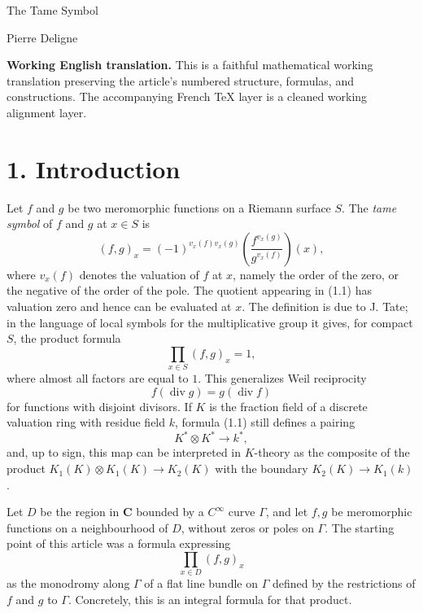 \documentclass[11pt]{article}
\theoremstyle{remark}
\newcommand{\C}{\mathbf C}
\begin{document}
\begin{center}
 {\Large The Tame Symbol}\par
 \vspace{0.5em}
 {Pierre Deligne}\par
\end{center}

\noindent\textbf{Working English translation.} This is a faithful mathematical working translation preserving the article's numbered structure, formulas, and constructions. The accompanying French TeX layer is a cleaned working alignment layer.

\section*{1. Introduction}

Let $f$ and $g$ be two meromorphic functions on a Riemann surface $S$. The \emph{tame symbol} of $f$ and $g$ at $x\in S$ is
\begin{equation}\tag{1.1}
 (f,g)_x=(-1)^{v_x(f)v_x(g)}\left(\frac{f^{v_x(g)}}{g^{v_x(f)}}\right)(x),
\end{equation}
where $v_x(f)$ denotes the valuation of $f$ at $x$, namely the order of the zero, or the negative of the order of the pole. The quotient appearing in (1.1) has valuation zero and hence can be evaluated at $x$. The definition is due to J. Tate; in the language of local symbols for the multiplicative group it gives, for compact $S$, the product formula
\begin{equation}\tag{1.2}
 \prod_{x\in S}(f,g)_x=1,
\end{equation}
where almost all factors are equal to $1$. This generalizes Weil reciprocity
\[
 f(\operatorname{div} g)=g(\operatorname{div} f)
\]
for functions with disjoint divisors. If $K$ is the fraction field of a discrete valuation ring with residue field $k$, formula (1.1) still defines a pairing
\[
 K^*\otimes K^*\longrightarrow k^*,
\]
and, up to sign, this map can be interpreted in $K$-theory as the composite of the product $K_1(K)\otimes K_1(K)\to K_2(K)$ with the boundary $K_2(K)\to K_1(k)$.

Let $D$ be the region in $\C$ bounded by a $C^\infty$ curve $\Gamma$, and let $f,g$ be meromorphic functions on a neighbourhood of $D$, without zeros or poles on $\Gamma$. The starting point of this article was a formula expressing
\[
 \prod_{x\in D}(f,g)_x
\]
as the monodromy along $\Gamma$ of a flat line bundle on $\Gamma$ defined by the restrictions of $f$ and $g$ to $\Gamma$. Concretely, this is an integral formula for that product.
\end{document}
